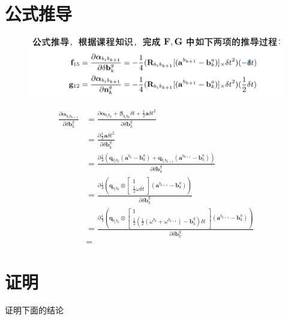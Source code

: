 \documentclass[oneside]{article}
\begin{document}
\section{公式推导}
\begin{figure}[htbp]
    \centering
    \includegraphics[width=.8\linewidth]{figures/fig3.png}    
\end{figure}
\begin{align}
    \frac{\partial \boldsymbol{\alpha}_{b_{i} b_{k+1}}}{\partial \delta \mathbf{b}_{k}^{g}}    
 &= \frac{\partial\boldsymbol{\alpha}_{b_{i} b_{k}}+\boldsymbol{\beta}_{b_{i} b_{k}} \delta t+\frac{1}{2} \mathbf{a} \delta t^{2}}{\partial \delta \mathbf{b}_{k}^{g}} \\
 &= \frac{\partial\frac{1}{2} \mathbf{a} \delta t^{2}}{\partial \delta \mathbf{b}_{k}^{g}} \\
 &= \frac{\partial\frac{1}{4}\left(\mathbf{q}_{b_{i} b_{k}}\left({\mathbf{a}}^{b_{k}}-\mathbf{b}_{k}^{a}\right)+\mathbf{q}_{b_{i} b_{k+1}}\left({\mathbf{a}}^{b_{k+1}}-\mathbf{b}_{k}^{a}\right)\right)}{\partial \delta \mathbf{b}_{k}^{g}} \\
 &= \frac{\partial\frac{1}{4}\left(\mathbf{q}_{b_{i} b_{k}} \otimes\left[\begin{array}{c}{1} \\ {\frac{1}{2} \omega \delta t}\end{array}\right]\left({\mathbf{a}}^{b_{k+1}}-\mathbf{b}_{k}^{a}\right)\right)}{\partial \delta \mathbf{b}_{k}^{g}} \\
 &= \frac{\partial\frac{1}{4}\left(\mathbf{q}_{b_{i} b_{k}} \otimes\left[\begin{array}{c}{1} \\ {\frac{1}{2} \left(\frac{1}{2}\left(\omega^{b_{k}}+\omega^{b_{k+1}}\right)-\mathbf{b}_{k}^{g}\right) \delta t}\end{array}\right]\left({\mathbf{a}}^{b_{k+1}}-\mathbf{b}_{k}^{a}\right)\right)}{\partial \delta \mathbf{b}_{k}^{g}} \\
 &= 
\end{align}
\section{证明}
证明下面的结论
\end{document}

